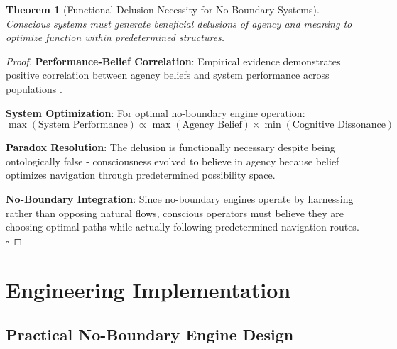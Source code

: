 \documentclass[11pt,a4paper]{article}
\newtheorem{theorem}{Theorem}[section]
\theoremstyle{remark}
\begin{document}
\begin{theorem}[Functional Delusion Necessity for No-Boundary Systems]
Conscious systems must generate beneficial delusions of agency and meaning to optimize function within predetermined structures.
\end{theorem}

\begin{proof}
\textbf{Performance-Belief Correlation}: Empirical evidence demonstrates positive correlation between agency beliefs and system performance across populations \cite{bandura1997self}.

\textbf{System Optimization}: For optimal no-boundary engine operation:
\begin{equation}
\max(\text{System Performance}) \propto \max(\text{Agency Belief}) \times \min(\text{Cognitive Dissonance})
\end{equation}

\textbf{Paradox Resolution}: The delusion is functionally necessary despite being ontologically false - consciousness evolved to believe in agency because belief optimizes navigation through predetermined possibility space.

\textbf{No-Boundary Integration}: Since no-boundary engines operate by harnessing rather than opposing natural flows, conscious operators must believe they are choosing optimal paths while actually following predetermined navigation routes. $\square$
\end{proof}

\section{Engineering Implementation}

\subsection{Practical No-Boundary Engine Design}
\end{document}
